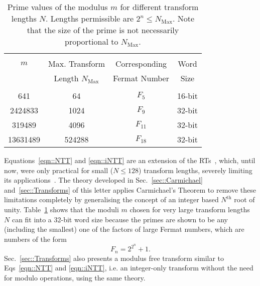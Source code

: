\documentclass[twocolumn]{IEEEtran}
\newcommand{\modulusSymbol}{m}
\newcommand{\FermatSymbol}{F}
\newcommand{\eqnsTag}{Eqs}
\newcommand{\tabTag}{Table}
\newcommand{\secTag}{Sec.}
\begin{document}
\begin{table}[htbp]
	\centering \begin{tabular}{c c c c} \hline\hline \\[-1.5ex]
$m$ & Max. Transform & Corresponding & Word \\[-1ex]
	\raisebox{1.75ex}{Prime} & Length $N_{\text{Max}}$ & Fermat Number & Size  \\[0.5ex]
	\hline \\[-1.5ex]
	641 & 64 & $\FermatSymbol_5$ & 16-bit\\[0.5ex]
	2424833 & 1024 & $\FermatSymbol_9$ & 32-bit\\[0.5ex]
	319489 & 4096 & $\FermatSymbol_{11}$ & 32-bit\\[0.5ex]
	13631489 & 524288 & $\FermatSymbol_{18}$ & 32-bit\\[0.5ex]
	\hline \hline \end{tabular}
	\caption{Prime values of the modulus $\modulusSymbol$ for different transform lengths $N$. Lengths permissible are $2^n \leqslant N_{\text{Max}}$. Note that the size of the prime is not necessarily proportional to $N_{\text{Max}}$.\label{tab::Primes}}
\end{table}

Equations~\eqref{eqn::NTT} and \eqref{eqn::iNTT} are an extension of the \acp{RT}~\citep{Agarwal1974}, which, until now, were only practical for small ($N \leqslant 128$) transform lengths, severely limiting its applications~\citep{Agarwal1974a}. The theory developed in \secTag~\ref{sec::Carmichael} and~\ref{sec::Transforms} of this letter applies Carmichael's Theorem to remove these limitations completely by generalising the concept of an integer based $N^{\text{th}}$ root of unity. \tabTag~\ref{tab::Primes} shows that the moduli $\modulusSymbol$ chosen for very large transform lengths $N$ can fit into a 32-bit word size because the primes are shown to be any (including the smallest) one of the factors of large Fermat numbers, which are numbers of the form
\begin{equation}\label{eqn::FermatNumbers}
 F_n = 2^{2^n} + 1.
\end{equation}
\secTag~\ref{sec::Transforms} also presents a modulus free transform similar to \eqnsTag~\eqref{eqn::NTT} and \eqref{eqn::iNTT}, i.e. an integer-only transform without the need for modulo operations, using the same theory.
\end{document}
